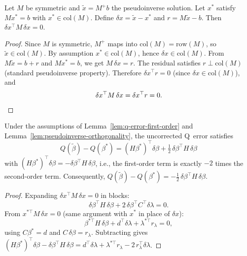 \begin{lemma}\label{lem:pseudoinverse-orthogonality}
Let $M$ be symmetric and $\tilde x = M^+ b$ the pseudoinverse solution.
Let $x^*$ satisfy $M x^* = b$ with $x^* \in \mathrm{col}(M)$.
Define $\delta x = \tilde x - x^*$ and $r = M\tilde x - b$.
Then $\delta x^\top M\, \delta x = 0$.
\end{lemma}

\begin{proof}
Since $M$ is symmetric, $M^+$ maps into $\mathrm{col}(M) = \mathrm{row}(M)$,
so $\tilde x \in \mathrm{col}(M)$. By assumption $x^* \in \mathrm{col}(M)$,
hence $\delta x \in \mathrm{col}(M)$.
From $M\tilde x = b + r$ and $M x^* = b$, we get $M\,\delta x = r$.
The residual satisfies $r \perp \mathrm{col}(M)$ (standard pseudoinverse property).
Therefore $\delta x^\top r = 0$ (since $\delta x \in \mathrm{col}(M)$), and
\[
  \delta x^\top M\,\delta x = \delta x^\top r = 0. \qedhere
\]
\end{proof}


\begin{corollary}\label{cor:taylor-structure}
Under the assumptions of Lemma~\ref{lem:q-error-first-order} and
Lemma~\ref{lem:pseudoinverse-orthogonality}, the uncorrected Q~error satisfies
\[
  Q(\tilde\beta) - Q(\beta^*)
  = (H\beta^*)^\top\delta\beta + \tfrac{1}{2}\,\delta\beta^\top H\,\delta\beta
\]
with $(H\beta^*)^\top\delta\beta = -\delta\beta^\top H\,\delta\beta$,
i.e., the first-order term is exactly $-2$ times the second-order term.
Consequently, $Q(\tilde\beta) - Q(\beta^*) = -\tfrac{1}{2}\,\delta\beta^\top H\,\delta\beta$.
\end{corollary}

\begin{proof}
Expanding $\delta x^\top M\,\delta x = 0$ in blocks:
\[
  \delta\beta^\top H\,\delta\beta + 2\,\delta\beta^\top C^\top\delta\lambda = 0.
\]
From $x^{*\top} M\,\delta x = 0$ (same argument with $x^*$ in place of $\delta x$):
\[
  \beta^{*\top} H\,\delta\beta + d^\top\delta\lambda + \lambda^{*\top} r_\lambda = 0,
\]
using $C\beta^* = d$ and $C\,\delta\beta = r_\lambda$.
Subtracting gives
$(H\beta^*)^\top\delta\beta - \delta\beta^\top H\,\delta\beta
= d^\top\delta\lambda + \lambda^{*\top} r_\lambda - 2\,r_\lambda^\top\delta\lambda$.
\end{proof}


